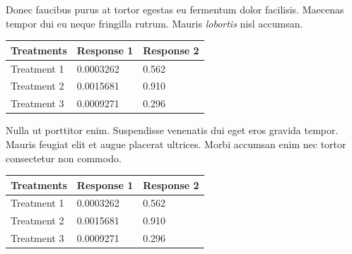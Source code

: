 \documentclass[landscape,a0paper,fontscale=0.285]{baposter} %
\begin{document}
\begin{poster}
{    Donec faucibus purus at tortor egestas eu fermentum dolor facilisis. Maecenas tempor dui eu neque fringilla rutrum. Mauris \emph{lobortis} nisl accumsan.

        \begin{center}
    \begin{tabular}{l l l}
    \toprule
        \textbf{Treatments} & \textbf{Response 1} & \textbf{Response 2}\\
        \midrule
        Treatment 1 & 0.0003262 & 0.562 \\
        Treatment 2 & 0.0015681 & 0.910 \\
        Treatment 3 & 0.0009271 & 0.296 \\
        \bottomrule
        \end{tabular}
    \end{center}

    Nulla ut porttitor enim. Suspendisse venenatis dui eget eros gravida tempor. Mauris feugiat elit et augue placerat ultrices. Morbi accumsan enim nec tortor consectetur non commodo.

        \begin{center}
    \begin{tabular}{l l l}
    \toprule
        \textbf{Treatments} & \textbf{Response 1} & \textbf{Response 2}\\
        \midrule
        Treatment 1 & 0.0003262 & 0.562 \\
        Treatment 2 & 0.0015681 & 0.910 \\
        Treatment 3 & 0.0009271 & 0.296 \\
        \bottomrule
        \end{tabular}
    \end{center}
}


\end{poster}
\end{document}
